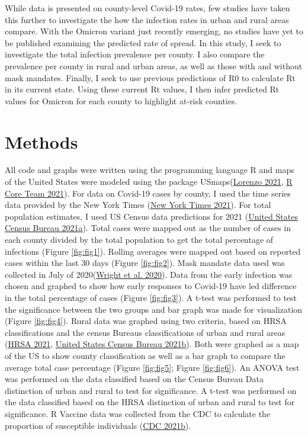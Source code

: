 \documentclass[
  12pt,
]{article}
\begin{document}
While data is presented on county-level Covid-19 rates, few studies have taken this further to investigate the how the infection rates in urban and rural areas compare. With the Omicron variant just recently emerging, no studies have yet to be published examining the predicted rate of spread. In this study, I seek to investigate the total infection prevalence per county. I also compare the prevalence per county in rural and urban areas, as well as those with and without mask mandates. Finally, I seek to use previous predictions of R0 to calculate Rt in its current state. Using these current Rt values, I then infer predicted Rt values for Omicron for each county to highlight at-risk counties.

\hypertarget{methods}{%
\section{Methods}\label{methods}}

All code and graphs were written using the programming language R and maps of the United States were modeled using the package USmaps(\protect\hyperlink{ref-lorenzo_usmap_2021}{Lorenzo 2021}, \protect\hyperlink{ref-r_core_team_r_2021}{R Core Team 2021}). For data on Covid-19 cases by county, I used the time series data provided by the New York Times (\protect\hyperlink{ref-new_york_times_coronavirus_2021}{New York Times 2021}). For total population estimates, I used US Census data predictions for 2021 (\protect\hyperlink{ref-united_states_census_bureau_county_2021}{United States Census Bureau 2021a}). Total cases were mapped out as the number of cases in each county divided by the total population to get the total percentage of infections (Figure \ref{fig:fig1}). Rolling averages were mapped out based on reported cases within the last 30 days (Figure \ref{fig:fig2}). Mask mandate data used was collected in July of 2020(\protect\hyperlink{ref-wright_tracking_2020}{Wright et al. 2020}). Data from the early infection was chosen and graphed to show how early responses to Covid-19 have led difference in the total percentage of cases (Figure \ref{fig:fig3}). A t-test was performed to test the significance between the two groups and bar graph was made for visualization (Figure \ref{fig:fig4}). Rural data was graphed using two criteria, based on HRSA classifications and the census Bureaus classifications of urban and rural areas (\protect\hyperlink{ref-hrsa_defining_2021}{HRSA 2021}, \protect\hyperlink{ref-united_states_census_bureau_2010_2021}{United States Census Bureau 2021b}). Both were graphed as a map of the US to show county classification as well as a bar graph to compare the average total case percentage (Figure \ref{fig:fig5}; Figure \ref{fig:fig6}). An ANOVA test was performed on the data classified based on the Census Bureau Data distinction of urban and rural to test for significance. A t-test was performed on the data classified based on the HRSA distinction of urban and rural to test for significance. R Vaccine data was collected from the CDC to calculate the proportion of susceptible individuals (\protect\hyperlink{ref-cdc_covid-19_2021}{CDC 2021b}).
\end{document}
